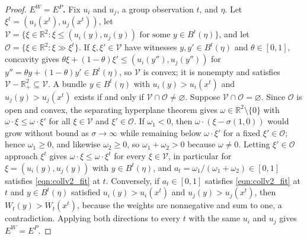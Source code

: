 \documentclass[11 pt]{article}
\begin{document}
\begin{proof}
\textbf{\boldmath$E^{W} = E^{P}$.} Fix $u_{i}$ and $u_{j}$, a group observation $t$, and $\eta$. Let $\xi^{t} = (u_{i}(x^{t}), u_{j}(x^{t}))$, let $\mathcal{V} = \{ \xi \in \mathbb{R}^{2} : \xi \leq (u_{i}(y), u_{j}(y)) \text{ for some } y \in B^{t}(\eta) \}$, and let $\mathcal{O} = \{ \xi \in \mathbb{R}^{2} : \xi \gg \xi^{t} \}$. If $\xi, \xi' \in \mathcal{V}$ have witnesses $y, y' \in B^{t}(\eta)$ and $\theta \in [0,1]$, concavity gives $\theta \xi + (1-\theta) \xi' \leq (u_{i}(y''), u_{j}(y''))$ for $y'' = \theta y + (1-\theta) y' \in B^{t}(\eta)$, so $\mathcal{V}$ is convex; it is nonempty and satisfies $\mathcal{V} - \mathbb{R}^{2}_{+} \subseteq \mathcal{V}$. A bundle $y \in B^{t}(\eta)$ with $u_{i}(y) > u_{i}(x^{t})$ and $u_{j}(y) > u_{j}(x^{t})$ exists if and only if $\mathcal{V} \cap \mathcal{O} \neq \varnothing$. Suppose $\mathcal{V} \cap \mathcal{O} = \varnothing$. Since $\mathcal{O}$ is open and convex, the separating hyperplane theorem gives $\omega \in \mathbb{R}^{2} \setminus \{0\}$ with $\omega \cdot \xi \leq \omega \cdot \xi'$ for all $\xi \in \mathcal{V}$ and $\xi' \in \mathcal{O}$. If $\omega_{1} < 0$, then $\omega \cdot (\xi - \sigma (1,0))$ would grow without bound as $\sigma \to \infty$ while remaining below $\omega \cdot \xi'$ for a fixed $\xi' \in \mathcal{O}$; hence $\omega_{1} \geq 0$, and likewise $\omega_{2} \geq 0$, so $\omega_{1} + \omega_{2} > 0$ because $\omega \neq 0$. Letting $\xi' \in \mathcal{O}$ approach $\xi^{t}$ gives $\omega \cdot \xi \leq \omega \cdot \xi^{t}$ for every $\xi \in \mathcal{V}$, in particular for $\xi = (u_{i}(y), u_{j}(y))$ with $y \in B^{t}(\eta)$, and $a_{t} = \omega_{1}/(\omega_{1} + \omega_{2}) \in [0,1]$ satisfies \eqref{eqn:collv2_fit} at $t$. Conversely, if $a_{t} \in [0,1]$ satisfies \eqref{eqn:collv2_fit} at $t$ and $y \in B^{t}(\eta)$ satisfied $u_{i}(y) > u_{i}(x^{t})$ and $u_{j}(y) > u_{j}(x^{t})$, then $W_{t}(y) > W_{t}(x^{t})$, because the weights are nonnegative and sum to one, a contradiction. Applying both directions to every $t$ with the same $u_{i}$ and $u_{j}$ gives $E^{W} = E^{P}$.


\end{proof}
\end{document}
